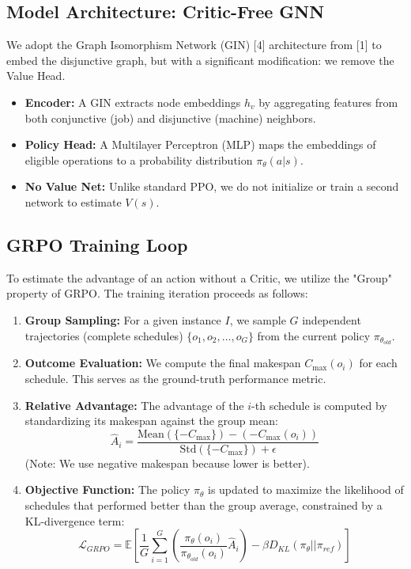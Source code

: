 \documentclass{article}
\begin{document}
\subsection{Model Architecture: Critic-Free GNN}
We adopt the Graph Isomorphism Network (GIN) [4] architecture from [1] to embed the disjunctive graph, but with a significant modification: we remove the Value Head.
\begin{itemize}
    \item \textbf{Encoder:} A GIN extracts node embeddings $h_v$ by aggregating features from both conjunctive (job) and disjunctive (machine) neighbors.
    \item \textbf{Policy Head:} A Multilayer Perceptron (MLP) maps the embeddings of eligible operations to a probability distribution $\pi_\theta(a|s)$.
    \item \textbf{No Value Net:} Unlike standard PPO, we do not initialize or train a second network to estimate $V(s)$.
\end{itemize}

\subsection{GRPO Training Loop}
To estimate the advantage of an action without a Critic, we utilize the "Group" property of GRPO. The training iteration proceeds as follows:

\begin{enumerate}
    \item \textbf{Group Sampling:} For a given instance $I$, we sample $G$ independent trajectories (complete schedules) $\{o_1, o_2, \dots, o_G\}$ from the current policy $\pi_{\theta_{old}}$.
    
    \item \textbf{Outcome Evaluation:} We compute the final makespan $C_{\max}(o_i)$ for each schedule. This serves as the ground-truth performance metric.
    
    \item \textbf{Relative Advantage:} The advantage of the $i$-th schedule is computed by standardizing its makespan against the group mean:
    \begin{equation}
        \hat{A}_i = \frac{\text{Mean}(\{-C_{\max}\}) - (-C_{\max}(o_i))}{\text{Std}(\{-C_{\max}\}) + \epsilon}
    \end{equation}
    (Note: We use negative makespan because lower is better).
    
    \item \textbf{Objective Function:} The policy $\pi_\theta$ is updated to maximize the likelihood of schedules that performed better than the group average, constrained by a KL-divergence term:
    \begin{equation}
        \mathcal{L}_{GRPO} = \mathbb{E} \left[ \frac{1}{G} \sum_{i=1}^{G} \left( \frac{\pi_\theta(o_i)}{\pi_{\theta_{old}}(o_i)} \hat{A}_i \right) - \beta D_{KL}(\pi_\theta || \pi_{ref}) \right]
    \end{equation}
\end{enumerate}
\end{document}
